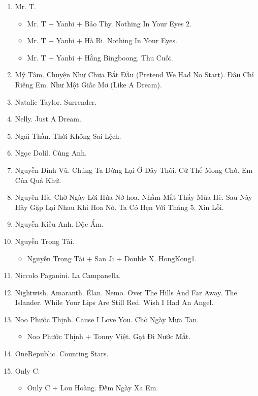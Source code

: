\documentclass{article}
\begin{document}
\begin{enumerate}
\begin{itemize}
	\end{itemize}
	\item {\sc Mr. T.}
	\begin{itemize}
		\item {\sc Mr. T $+$ Yanbi $+$ Bảo Thy.} Nothing In Your Eyes 2.
		\item {\sc Mr. T $+$ Yanbi $+$ Hà Bi.} Nothing In Your Eyes.
		\item {\sc Mr. T $+$ Yanbi $+$ Hằng Bingboong.} Thu Cuối.
	\end{itemize}
	\item {\sc Mỹ Tâm.} Chuyện Như Chưa Bắt Đầu (Pretend We Had No Start). Đâu Chỉ Riêng Em. Như Một Giấc Mơ (Like A Dream).
	\item {\sc Natalie Taylor.} Surrender.
	\item {\sc Nelly.} Just A Dream.
	\item {\sc Ngải Thần.} Thời Không Sai Lệch.
	\item {\sc Ngọc Dolil.} Cùng Anh.
	\item {\sc Nguyễn Đình Vũ.} Chúng Ta Dừng Lại Ở Đây Thôi. Cứ Thế Mong Chờ. Em Của Quá Khứ.
	\item {\sc Nguyên Hà.} Chờ Ngày Lời Hứa Nở hoa. Nhắm Mắt Thấy Mùa Hè. Sau Này Hãy Gặp Lại Nhau Khi Hoa Nở. Ta Có Hẹn Với Tháng 5. Xin Lỗi.
	\item {\sc Nguyễn Kiều Anh.} Độc Ẩm.
	\item {\sc Nguyễn Trọng Tài.}
	\begin{itemize}
		\item {\sc Nguyễn Trọng Tài $+$ San Ji $+$ Double X.} HongKong1.
	\end{itemize}
	\item {\sc Niccolo Paganini.} La Campanella.
	\item {\sc Nightwish.} Amaranth. \'Elan. Nemo. Over The Hills And Far Away. The Islander. While Your Lips Are Still Red. Wish I Had An Angel.
	\item {\sc Noo Phước Thịnh.} Cause I Love You. Chờ Ngày Mưa Tan.
	\begin{itemize}
		\item {\sc Noo Phước Thịnh $+$ Tonny Việt.} Gạt Đi Nước Mắt.
	\end{itemize}
	\item {\sc OneRepublic.} Counting Stars.
	\item {\sc Only C.}
	\begin{itemize}
		\item {\sc Only C $+$ Lou Hoàng.} Đếm Ngày Xa Em.
	\end{itemize}

\end{enumerate}
\end{document}
